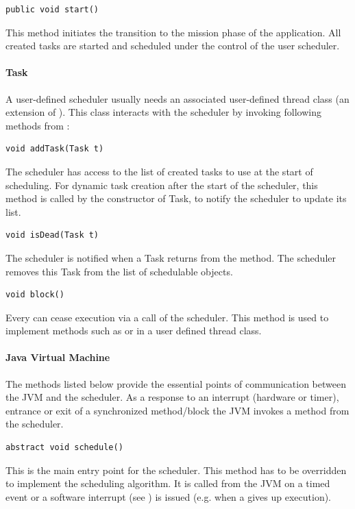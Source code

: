 \begin{lstlisting}[emph=start]
public void start()
\end{lstlisting}
This method initiates the transition to the mission phase of the
application. All created tasks are started and scheduled under the
control of the user scheduler.

\paragraph{Task}

A user-defined scheduler usually needs an associated user-defined
thread class (an extension of ). This class interacts
with the scheduler by invoking following methods from
:

\begin{lstlisting}[emph=addTask]
void addTask(Task t)
\end{lstlisting}
The scheduler has access to the list of created tasks to use at the
start of scheduling. For dynamic task creation after the start of
the scheduler, this method is called by the constructor of Task, to
notify the scheduler to update its list.

\begin{lstlisting}[emph=isDead]
void isDead(Task t)
\end{lstlisting}
The scheduler is notified when a Task returns from the 
method. The scheduler removes this Task from the list of schedulable
objects.

\begin{lstlisting}[emph=block]
void block()
\end{lstlisting}
Every  can cease execution via a call of the scheduler.
This method is used to implement methods such as
 or  in a user defined
thread class.

\paragraph{Java Virtual Machine}

The methods listed below provide the essential points of
communication between the JVM and the scheduler. As a response to an
interrupt (hardware or timer), entrance or exit of a synchronized
method/block the JVM invokes a method from the scheduler.

\begin{lstlisting}[emph=schedule]
abstract void schedule()
\end{lstlisting}
This is the main entry point for the scheduler. This method has to
be overridden to implement the scheduling algorithm. It is called
from the JVM on a timed event or a software interrupt (see
) is issued (e.g. when a  gives up
execution).

